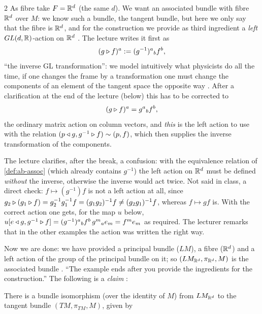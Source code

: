 \begin{paracol}{2}
As fibre take $F=\mathbb{R}^d$ (the same $d$). We want an associated bundle with fibre $\mathbb{R}^d$ over $M$: we know such a bundle, the tangent bundle, but here we only say that the fibre is $\mathbb{R}^d$, and for the construction we provide as third ingredient a \emph{left} $GL(d,\mathbb{R})$-action on $\mathbb{R}^d$     . The lecture writes it first as
\[
  (g\mathbin{\triangleright} f)^a:=(g^{-1})^a{}_bf^b ,
\]
``the inverse GL transformation'': we model intuitively what physicists do all the time, if one changes the frame by a transformation one must change the components of an element of the tangent space the opposite way    . After a clarification at the end of the lecture (below) this has to be corrected to
\[
  (g\mathbin{\triangleright} f)^a=g^a{}_bf^b ,
\]
the ordinary matrix action on column vectors, and \emph{this} is the left action to use with the relation $(p\mathbin{\triangleleft} g,g^{-1}\mathbin{\triangleright} f)\sim(p,f)$, which then supplies the inverse transformation of the components.       
\begin{coursenote}
The lecture clarifies, after the break, a confusion: with the equivalence relation of \cref{def:ab-assoc} (which already contains $g^{-1}$) the left action on $\mathbb{R}^d$ must be defined \emph{without} the inverse, otherwise the inverse would act twice. Not said in class, a direct check: $f\mapsto(g^{-1})f$ is not a left action at all, since $g_2\mathbin{\triangleright}(g_1\mathbin{\triangleright} f)=g_2^{-1}g_1^{-1}f=(g_1g_2)^{-1}f\ne(g_2g_1)^{-1}f$, whereas $f\mapsto gf$ is. With the correct action one gets, for the map $u$ below, $u[e\mathbin{\triangleleft} g,g^{-1}\mathbin{\triangleright} f]=(g^{-1})^a{}_bf^b\,g^m{}_ae_m=f^me_m$ as required. The lecturer remarks that in the other examples the action was written the right way. 
\end{coursenote}
Now we are done: we have provided a principal bundle ($LM$), a fibre ($\mathbb{R}^d$) and a left action of the group of the principal bundle on it; so $(LM_{\mathbb{R}^d},\pi_{\mathbb{R}^d},M)$ is the associated bundle    . ``The example ends after you provide the ingredients for the construction.'' The following is a \emph{claim} :
\begin{proposition}\label{prop:ab-tangent}
There is a bundle isomorphism (over the identity of $M$) from $LM_{\mathbb{R}^d}$ to the tangent bundle $(TM,\pi_{TM},M)$, given by

\end{proposition}
\end{paracol}
